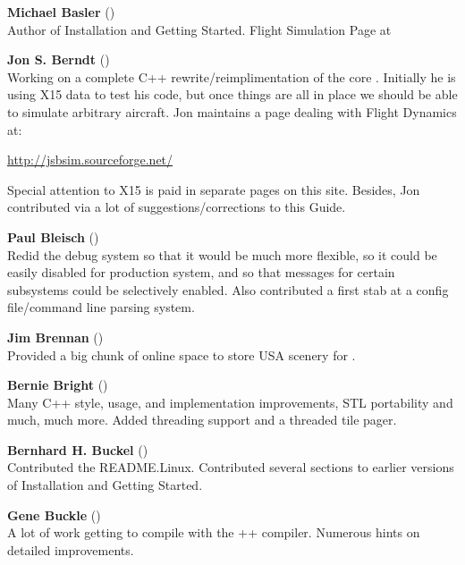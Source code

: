 \noindent \textbf{Michael Basler} ()\\
 Author of Installation and Getting Started. Flight Simulation Page at
  \medskip

\medskip

\noindent \textbf{Jon S. Berndt} ()\\
 Working on a complete C++ rewrite/reimplimentation of the core .
  Initially he is using X15 data to test his code, but once things are
  all in place we should be able to simulate arbitrary aircraft. Jon
  maintains a page dealing with Flight Dynamics at:
   \medskip

  \href{http://jsbsim.sourceforge.net/}{http://jsbsim.sourceforge.net/}
   \medskip

\noindent
  Special attention to X15 is paid in separate pages on this site. Besides, Jon
  contributed via a lot of suggestions/corrections to this Guide.
\medskip

\noindent \textbf{Paul Bleisch} ()\\
  Redid the debug system so that it would be much more
  flexible, so it could be easily disabled for production system, and
  so that messages for certain subsystems could be selectively
  enabled. Also contributed a first stab at a config file/command line parsing
  system.
 \medskip


\noindent \textbf{Jim Brennan} ()\\
  Provided a big chunk of online space to store USA scenery for \FlightGear{}$\!$.
 \medskip

\noindent \textbf{Bernie Bright}
()\\
  Many C++ style, usage, and implementation improvements, STL
  portability and much, much more.
  Added threading support and a threaded tile pager.
 \medskip

\noindent \textbf{Bernhard H. Buckel}
()\\
  Contributed the README.Linux.  Contributed several sections to earlier versions of
 Installation and Getting Started.
 \medskip

\noindent \textbf{Gene Buckle} ()\\
  A lot of work getting \FlightGear{} to compile with the ++
  compiler. Numerous hints on detailed improvements.
 \medskip


